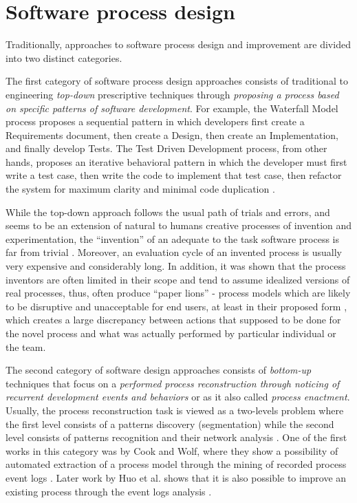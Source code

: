 \section{Software process design}\label{section_software_process_design}
Traditionally, approaches to software process design and improvement are divided into two distinct categories. 

The first category of software process design approaches consists of traditional to engineering 
\textit{top-down} prescriptive techniques through 
\textit{proposing a process based on specific patterns of software development}. 
For example, the Waterfall Model process proposes a sequential pattern in which developers first create a 
Requirements document, then create a Design, then create an Implementation, and finally develop Tests. 
The Test Driven Development process, from other hands, proposes an iterative behavioral pattern in which
the developer must first write a test case, then write the code to implement that test case, then refactor the 
system for maximum clarity and minimal code duplication \cite{citeulike:6086365}. 

While the top-down approach follows the usual path of trials and errors, and seems to be an extension 
of natural to humans creative processes of invention and experimentation, 
the ``invention'' of an adequate to the task software process is far from trivial 
\cite{citeulike:5043104} \cite{citeulike:1986013}. Moreover, an evaluation cycle of an invented process
is usually very expensive and considerably long.
In addition, it was shown that the process inventors are often limited in their scope and tend to assume 
idealized versions of real processes, thus, often produce ``paper lions'' - process models which are 
likely to be disruptive and unacceptable for end users, at least in their proposed form 
\cite{citeulike:9758924}, which creates a large discrepancy between actions that supposed to be done for 
the novel process and what was actually performed by particular individual or the team.

The second category of software design approaches consists of \textit{bottom-up} techniques 
that focus on a \textit{performed process reconstruction through noticing of recurrent development 
events and behaviors} or as it also called \textit{process enactment}. 
Usually, the process reconstruction task is viewed as a two-levels problem where the first level 
consists of a patterns discovery (segmentation) while the second level consists of patterns recognition 
and their network analysis \cite{citeulike:2703162}.
One of the first works in this category was by Cook and Wolf, where they show a
possibility of automated extraction of a process model through the mining of recorded 
process event logs \cite{citeulike:328044} \cite{citeulike:5120757} \cite{citeulike:5128143}. 
Later work by Huo et al. shows that it is also possible to improve an existing process
through the event logs analysis \cite{citeulike:7691059} \cite{citeulike:7690766}. 

